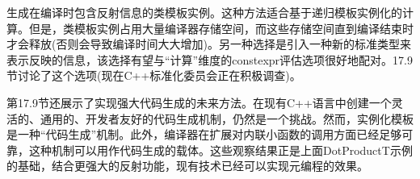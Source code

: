 生成在编译时包含反射信息的类模板实例。这种方法适合基于递归模板实例化的计算。但是，类模板实例占用大量编译器存储空间，而这些存储空间直到编译结束时才会释放(否则会导致编译时间大大增加)。另一种选择是引入一种新的标准类型来表示反映的信息，该选择有望与“计算”维度的constexpr评估选项很好地配对。17.9节讨论了这个选项(现在C++标准化委员会正在积极调查)。

第17.9节还展示了实现强大代码生成的未来方法。在现有C++语言中创建一个灵活的、通用的、开发者友好的代码生成机制，仍然是一个挑战。然而，实例化模板是一种“代码生成”机制。此外，编译器在扩展对内联小函数的调用方面已经足够可靠，这种机制可以用作代码生成的载体。这些观察结果正是上面DotProductT示例的基础，结合更强大的反射功能，现有技术已经可以实现元编程的效果。











































